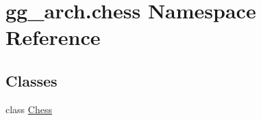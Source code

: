 \hypertarget{namespacegg__arch_1_1chess}{\section{gg\-\_\-arch.\-chess Namespace Reference}
\label{namespacegg__arch_1_1chess}
}
\subsection*{Classes}
\begin{DoxyCompactItemize}
\item 
class \hyperlink{classgg__arch_1_1chess_1_1_chess}{Chess}
\end{DoxyCompactItemize}
